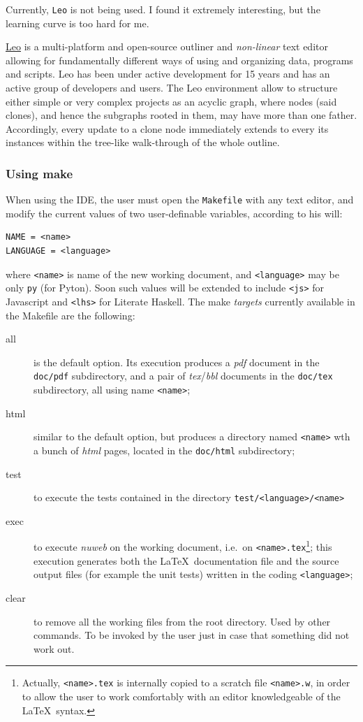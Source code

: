\documentclass[11pt,oneside]{article}	%
\begin{document}
Currently, \texttt{Leo} is not being used. I found it extremely interesting, but the learning curve is too hard for me.

\href{http://leoeditor.com}{Leo} is a multi-platform and open-source outliner and \emph{non-linear} text editor allowing for 
fundamentally different ways of using and organizing data, programs and scripts. 
Leo has been under active development for 15 years and has an active group of developers and users.
The Leo environment allow to structure either simple or very complex projects as an acyclic graph, where nodes (said clones), and hence the subgraphs rooted in them, may have more than one father.
Accordingly, every update to a clone node immediately extends to every its instances within the tree-like walk-through of the whole outline.


\subsubsection{Using make}

When using the IDE, the user must open the \texttt{Makefile} with any text editor, and modify the current values of two user-definable variables, according to his will:

\begin{verbatim}
NAME = <name>
LANGUAGE = <language>
\end{verbatim}
where \texttt{<name>} is name of the new working document, and \texttt{<language>} may be only \texttt{py} (for Pyton). Soon such values will be extended to include \texttt{<js>} for Javascript and \texttt{<lhs>} for Literate Haskell.
The make \emph{targets} currently available in the Makefile are the following:
\begin{description}
\item[all] 
is the default option. Its execution produces a \emph{pdf} document in the \texttt{doc/pdf} subdirectory, and a pair of \emph{tex}/\emph{bbl} documents in the \texttt{doc/tex} subdirectory, all using name \texttt{<name>};
\item[html] 
similar to the default option, but produces a directory named \texttt{<name>} wth a bunch of \emph{html} pages, located in the \texttt{doc/html} subdirectory;

\item[test] 
to execute the tests contained in the directory \texttt{test/<language>/<name>}
\item[exec] 
to execute \emph{nuweb} on the working document, i.e.~on \texttt{<name>.tex}\footnote{Actually, \texttt{<name>.tex} is internally copied to a scratch file \texttt{<name>.w}, in order to allow the user to work comfortably with an editor knowledgeable of the \LaTeX\ syntax.}; this execution generates both the \LaTeX\ documentation file and the source output files (for example the unit tests) written in the coding \texttt{<language>};
\item[clear] 
to remove all the working files from the root directory. Used by other commands. To be invoked by the user just in case that something did not work out.
\end{description}
\end{document}
